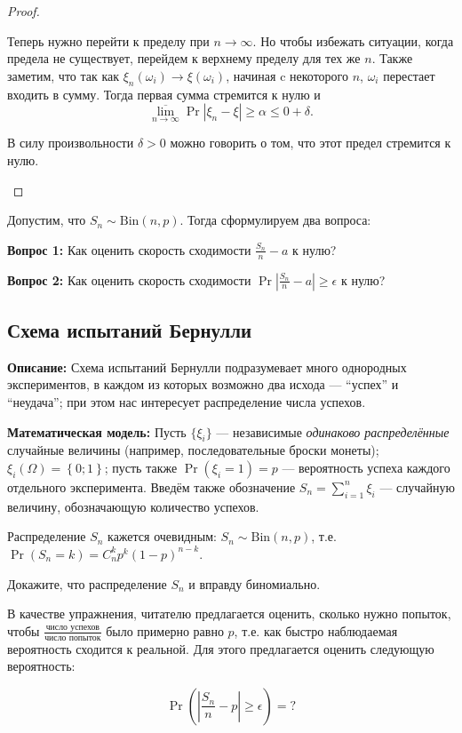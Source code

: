 \begin{proof}
\begin{itemize}
        Теперь нужно перейти к пределу при \(n \to \infty.\) Но чтобы избежать ситуации, когда предела не существует, перейдем к верхнему пределу для тех же \(n\). Также заметим, что так как \(\xi_n(\omega_i) \to \xi(\omega_i)\), начиная c некоторого \(n\), \(\omega_i\) перестает входить в сумму. Тогда первая сумма стремится к нулю и
        \[
        \overline{\lim_{n \to \infty}} \Pr{\left|\xi_n - \xi\right| \geq \alpha} \leq 0 + \delta.
        \]
        
        В силу произвольности \(\delta > 0\) можно говорить о том, что этот предел стремится к нулю. \(\qedhere\)
	\end{itemize}
\end{proof}

Допустим, что \(S_n \sim \mathrm{Bin}(n, p)\). Тогда сформулируем два вопроса:

\textbf{Вопрос 1:} Как оценить скорость сходимости \(\frac{S_n}{n} - a\) к нулю?

\textbf{Вопрос 2:} Как оценить скорость сходимости \(\Pr{\left|\frac{S_n}{n} - a\right| \geq \epsilon}\) к нулю?

\subsection{Схема испытаний Бернулли}
\textbf{Описание:} Схема испытаний Бернулли подразумевает много однородных экспериментов, в каждом из которых возможно два исхода --- ``успех'' и ``неудача''; при этом нас интересует распределение числа успехов.

\textbf{Математическая модель:} Пусть $\{\xi_i\}$ --- независимые \emph{одинаково распределённые} случайные величины (например, последовательные броски монеты); $\xi_i(\Omega) = \left\{ 0; 1 \right\}$; пусть также $\Pr(\xi_i = 1) = p$ --- вероятность успеха каждого отдельного эксперимента. Введём также обозначение $S_n = \sum\limits_{i = 1}^n \xi_i$ --- случайную величину, обозначающую количество успехов.

Распределение $S_n$ кажется очевидным: $S_n \sim \mathrm{Bin}(n, p)$, т.е. $\Pr(S_n = k) = C_n^kp^k(1-p)^{n-k}$.

\begin{exercise}
    Докажите, что распределение $S_n$ и вправду биномиально.
\end{exercise}

\begin{exercise}
    В качестве упражнения, читателю предлагается оценить, сколько нужно попыток, чтобы $\frac{\text{число успехов}}{\text{число попыток}}$ было примерно равно $p$, т.е. как быстро наблюдаемая вероятность сходится к реальной. Для этого предлагается оценить следующую вероятность:
\end{exercise}
\[
    \Pr\left(\left|\frac{S_n}{n}-p\right|\geq \epsilon\right) = ?
\]

